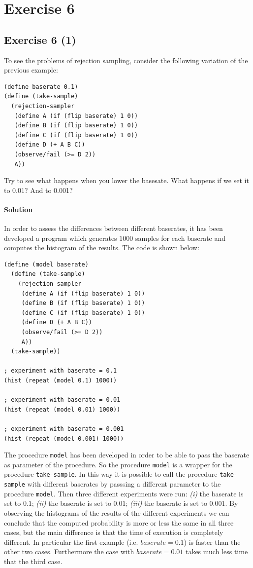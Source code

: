 \section*{Exercise 6}

\subsection*{Exercise 6 (1)}
To see the problems of rejection sampling, consider the following variation of the previous example:

\begin{lstlisting}
(define baserate 0.1)
(define (take-sample)
  (rejection-sampler
   (define A (if (flip baserate) 1 0))
   (define B (if (flip baserate) 1 0))
   (define C (if (flip baserate) 1 0))
   (define D (+ A B C))
   (observe/fail (>= D 2))
   A))
\end{lstlisting}

Try to see what happens when you lower the basesate. What happens if we set it to 0.01? And to 0.001?

\paragraph{Solution}
In order to assess the differences between different baserates, it has been developed a program which generates $1000$ samples for each
baserate and computes the histogram of the results. The code is shown below:
\begin{lstlisting}
(define (model baserate)
  (define (take-sample)
    (rejection-sampler
     (define A (if (flip baserate) 1 0))
     (define B (if (flip baserate) 1 0))
     (define C (if (flip baserate) 1 0))
     (define D (+ A B C))
     (observe/fail (>= D 2))
     A))
  (take-sample))

; experiment with baserate = 0.1
(hist (repeat (model 0.1) 1000))

; experiment with baserate = 0.01
(hist (repeat (model 0.01) 1000))

; experiment with baserate = 0.001
(hist (repeat (model 0.001) 1000))
\end{lstlisting}

The procedure \texttt{model} has been developed in order to be able to pass the baserate as parameter of the procedure. So the 
procedure \texttt{model} is a wrapper for the procedure \texttt{take-sample}. In this way it is possible to call the procedure 
\texttt{take-sample} with different baserates by passsing a different parameter to the procedure \texttt{model}.
Then three different experiments were run: \textit{(i)} the baserate is set to $0.1$; \textit{(ii)} the baserate is set to $0.01$;
\textit{(iii)} the baserate is set to $0.001$.
By observing the histograms of the results of the different experiments we can conclude that the computed probability is more or less
the same in all three cases, but the main difference is that the time of execution is completely different.
In particular the first example (i.e. $baserate = 0.1$) is faster than the other two cases.
Furthermore the case with $baserate = 0.01$ takes much less time that the third case.

